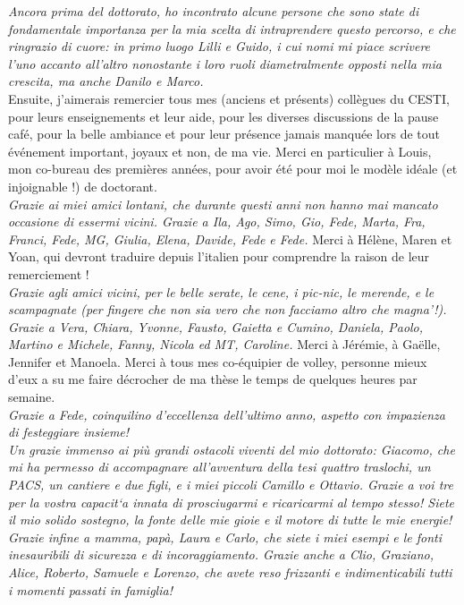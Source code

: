 \emph{Ancora prima del dottorato, ho incontrato alcune persone che sono state di fondamentale importanza per la mia scelta di intraprendere questo percorso, e che ringrazio di cuore: in primo luogo Lilli e Guido, i cui nomi mi piace scrivere l'uno accanto all'altro nonostante i loro ruoli diametralmente opposti nella mia crescita, ma anche Danilo e Marco.}\\

Ensuite, j'aimerais remercier tous mes (anciens et pr\'esents) coll\`{e}gues du CESTI, pour leurs enseignements et leur aide, pour les diverses discussions de la pause caf\'e, pour la belle ambiance et pour leur pr\'esence jamais manqu\'ee lors de tout \'ev\'enement important, joyaux et non, de ma vie.  Merci en particulier \`a Louis, mon co-bureau des premi\`{e}res ann\'ees, pour avoir \'et\'e pour moi le mod\`{e}le id\'eale (et injoignable !) de doctorant.  \\

\emph{Grazie ai miei amici lontani, che durante questi anni non hanno mai mancato occasione di essermi vicini. Grazie a Ila, Ago, Simo, Gio, Fede, Marta, Fra, Franci, Fede, MG, Giulia,  Elena, Davide, Fede e Fede.} Merci \`a H\'el\`{e}ne, Maren et Yoan, qui devront traduire depuis l'italien pour comprendre la raison de leur remerciement ! \\

\emph{Grazie agli amici vicini, per le belle serate, le cene, i pic-nic, le merende, e le scampagnate (per fingere che non sia vero che non facciamo altro che magna'!). Grazie a Vera, Chiara, Yvonne, Fausto, Gaietta e Cumino, Daniela, Paolo, Martino e Michele, Fanny, Nicola ed MT, Caroline.} Merci \`a J\'er\'emie, \`a Ga\"elle, Jennifer et Manoela. Merci \`a tous mes co-\'equipier de volley, personne mieux d'eux a su me faire d\'ecrocher de ma th\`{e}se le temps de quelques heures par semaine. \\

\emph{Grazie a Fede, coinquilino d'eccellenza dell'ultimo anno, aspetto con impazienza di festeggiare insieme!}\\

\emph{Un grazie immenso ai pi\`u grandi ostacoli viventi del mio dottorato: Giacomo, che mi ha permesso di accompagnare all'avventura della tesi quattro traslochi, un PACS, un cantiere e due figli, e i miei piccoli Camillo e Ottavio. Grazie a voi tre per la vostra capacit`a innata di prosciugarmi e ricaricarmi al tempo stesso! Siete il mio solido sostegno, la fonte delle mie gioie e il motore di tutte le mie energie!}\\

\emph{Grazie infine a mamma, pap\`a, Laura e Carlo, che siete i miei esempi e le fonti inesauribili di sicurezza e di  incoraggiamento. Grazie anche a Clio, Graziano, Alice, Roberto, Samuele e Lorenzo, che avete reso frizzanti e indimenticabili tutti i momenti passati in famiglia!}